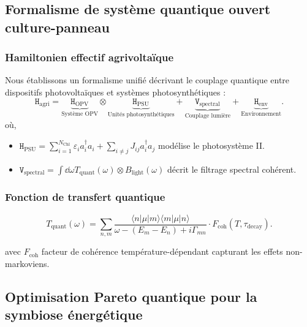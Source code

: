 \documentclass[12pt, a4paper]{article}
\begin{document}
\subsection{Formalisme de système quantique ouvert culture-panneau}

\subsubsection{Hamiltonien effectif agrivoltaïque}

Nous établissons un formalisme unifié décrivant le couplage quantique entre dispositifs photovoltaïques et systèmes photosynthétiques :
\begin{equation}
\mathtt{H}_{\text{agri}} = \underbrace{\mathtt{H}_{\text{OPV}}}_{\text{Système OPV}} \otimes \underbrace{\mathtt{H}_{\text{PSU}}}_{\text{Unités photosynthétiques}} + \underbrace{\mathtt{V}_{\text{spectral}}}_{\text{Couplage lumière}} + \underbrace{\mathtt{H}_{\text{env}}}_{\text{Environnement}}.
\end{equation}
où,
\begin{itemize}
    \item $\mathtt{H}_{\text{PSU}} = \sum_{i=1}^{N_{\text{Chl}}} \varepsilon_i a_i^\dagger a_i + \sum_{i\neq j} J_{ij} a_i^\dagger a_j$ modélise le photosystème II.
    \item $\mathtt{V}_{\text{spectral}} = \int \dd{\omega} T_{\text{quant}}(\omega) \otimes B_{\text{light}}(\omega)$ décrit le filtrage spectral cohérent.
\end{itemize}

\subsubsection{Fonction de transfert quantique}

\begin{equation}
T_{\text{quant}}(\omega) = \sum_{n,m} \frac{\langle n | \mu | m \rangle \langle m | \mu | n \rangle}{\omega - (E_m - E_n) + i\Gamma_{mn}} \cdot F_{\text{coh}}(T, \tau_{\text{decay}}).
\end{equation}

avec $F_{\text{coh}}$ facteur de cohérence température-dépendant capturant les effets non-markoviens.

\subsection{Optimisation Pareto quantique pour la symbiose énergétique}
\end{document}
